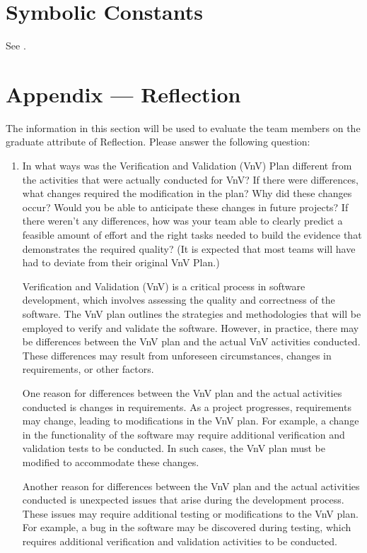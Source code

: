\documentclass[12pt, titlepage]{article}
\begin{document}
\section{Symbolic Constants}
See .




\newpage{}
\section*{Appendix --- Reflection}

The information in this section will be used to evaluate the team members on the
graduate attribute of Reflection.  Please answer the following question:

\begin{enumerate}
  \item In what ways was the Verification and Validation (VnV) Plan different
  from the activities that were actually conducted for VnV?  If there were
  differences, what changes required the modification in the plan?  Why did
  these changes occur?  Would you be able to anticipate these changes in future
  projects?  If there weren't any differences, how was your team able to clearly
  predict a feasible amount of effort and the right tasks needed to build the
  evidence that demonstrates the required quality?  (It is expected that most
  teams will have had to deviate from their original VnV Plan.)

Verification and Validation (VnV) is a critical process in software development, which involves assessing the quality and correctness of the software. The VnV plan outlines the strategies and methodologies that will be employed to verify and validate the software. However, in practice, there may be differences between the VnV plan and the actual VnV activities conducted. These differences may result from unforeseen circumstances, changes in requirements, or other factors.

One reason for differences between the VnV plan and the actual activities conducted is changes in requirements. As a project progresses, requirements may change, leading to modifications in the VnV plan. For example, a change in the functionality of the software may require additional verification and validation tests to be conducted. In such cases, the VnV plan must be modified to accommodate these changes.

Another reason for differences between the VnV plan and the actual activities conducted is unexpected issues that arise during the development process. These issues may require additional testing or modifications to the VnV plan. For example, a bug in the software may be discovered during testing, which requires additional verification and validation activities to be conducted.


\end{enumerate}
\end{document}
